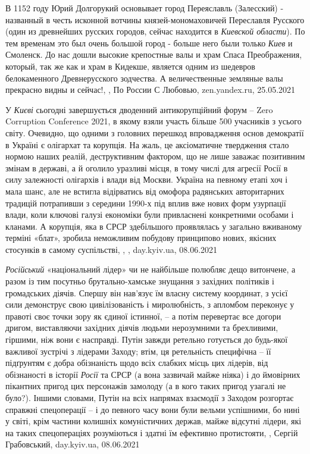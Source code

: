 В 1152 году Юрий Долгорукий основывает город Переяславль (Залесский) -
названный в честь исконной вотчины князей-мономаховичей Переславля Русского
(один из древнейших русских городов, сейчас находится в \emph{Киевской
области}). По тем временам это был очень большой город - больше него были
только \emph{Киев} и Смоленск. До нас дошли высокие крепостные валы и храм
Спаса Преображения, который, так же как и храм в Кидекше, является одним из
шедевров белокаменного Древнерусского зодчества. А величественные земляные валы
прекрасно видны и сейчас!,
, По России С Любовью, zen.yandex.ru, 25.05.2021

У \emph{Києві} сьогодні завершується дводенний антикорупційний форум – Zero Corruption
Conference 2021, в якому взяли участь більше 500 учасників з усього світу.
Очевидно, що одними з головних перешкод впровадження основ демократії в Україні
є олігархат та корупція. На жаль, це аксіоматичне твердження стало нормою наших
реалій, деструктивним фактором, що не лише заважає позитивним змінам в державі,
а й оголило уразливі місця, в тому числі для агресії Росії в силу залежності
олігархів і влади від Москви. Україна на певному етапі хоч і мала шанс, але не
встигла відірватись від омофора радянських авторитарних традицій потрапивши з
середини 1990-х під вплив вже нових форм узурпації влади, коли ключові галузі
економіки були привласнені конкретними особами і кланами. А корупція, яка в
СРСР здебільшого проявлялась у загально вживаному терміні «блат», зробила
неможливим побудову принципово нових, якісних стосунків в самому суспільстві,
, , day.kyiv.ua, 08.06.2021

\emph{Російський} «національний лідер» чи не найбільше полюбляє дещо витончене, а
разом із тим посутньо брутально-хамське знущання з західних політиків і
громадських діячів. Спершу він нав'язує їм власну систему координат, з усієї
сили демонструє свою цивілізованість і миролюбність, з апломбом переконує у
правоті своє точки зору як єдиної істинної, – а потім перевертає все догори
дригом, виставляючи західних діячів людьми нерозумними та брехливими, гіршими,
ніж вони є насправді. Путін завжди ретельно готується до будь-якої важливої
зустрічі з лідерами Заходу; втім, ця ретельність специфічна – її підґрунтям є
добра обізнаність щодо всіх слабких місць цих лідерів, від обізнаності в
історії \emph{Росії} та СРСР (а вона зазвичай майже ніяка) і до ймовірних пікантних
пригод цих персонажів замолоду (а в кого таких пригод узагалі не було?). Іншими
словами, Путін на всіх напрямах взаємодії з Заходом розгортає справжні
спецоперації – і до певного часу вони були вельми успішними, бо нині у світі,
крім частини колишніх комуністичних держав, майже відсутні лідери, які на таких
спецопераціях розуміються і здатні їм ефективно протистояти,
, Сергій Грабовський, day.kyiv.ua, 08.06.2021


